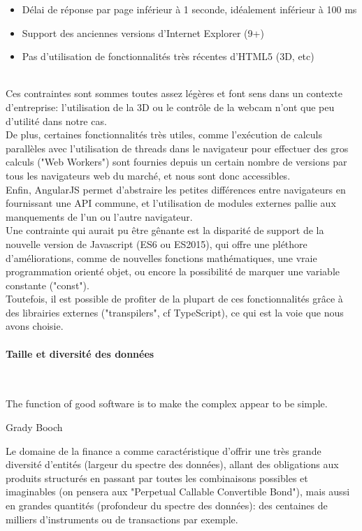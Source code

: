 \documentclass[a4paper,french,12pt]{article}
\begin{document}
	\begin{itemize}
		\item Délai de réponse par page inférieur à 1 seconde, idéalement inférieur à 100 ms
		\item Support des anciennes versions d'Internet Explorer (9+)
		\item Pas d'utilisation de fonctionnalités très récentes d'HTML5 (3D, etc)
	\end{itemize}~\\
	
 Ces contraintes sont sommes toutes assez légères et font sens dans un contexte d'entreprise: l'utilisation de la 3D ou le contrôle de la webcam n'ont que peu d'utilité dans notre cas.~\\	
 
 De plus, certaines fonctionnalités très utiles, comme l'exécution de calculs parallèles avec l'utilisation de threads dans le navigateur pour effectuer des gros calculs ("Web Workers") sont fournies depuis un certain nombre de versions par tous les navigateurs web du marché, et nous sont donc accessibles.~\\	
 
 Enfin, AngularJS permet d'abstraire les petites différences entre navigateurs en fournissant une API commune, et l'utilisation de modules externes pallie aux manquements de l'un ou l'autre navigateur.~\\	
 
 Une contrainte qui aurait pu être gênante est la disparité de support de la nouvelle version de Javascript (ES6 ou ES2015), qui offre une pléthore d'améliorations, comme de nouvelles fonctions mathématiques, une vraie programmation orienté objet, ou encore la possibilité de marquer une variable constante ("const").~\\	
 
 Toutefois, il est possible de profiter de la plupart de ces fonctionnalités grâce à des librairies externes ("transpilers", cf TypeScript), ce qui est la voie que nous avons choisie. 

	
		\paragraph{Taille et diversité des données} ~\\
		\epigraph{The function of good software is to make the complex appear to be simple.}{Grady Booch}

		Le domaine de la finance a comme caractéristique d'offrir une très grande diversité d'entités (largeur du spectre des données), allant des obligations aux produits structurés en passant par toutes les combinaisons possibles et imaginables (on pensera aux "Perpetual Callable Convertible Bond"), mais aussi en grandes quantités (profondeur du spectre des données): des centaines de milliers d'instruments ou de transactions par exemple.~\\
		
\end{document}
